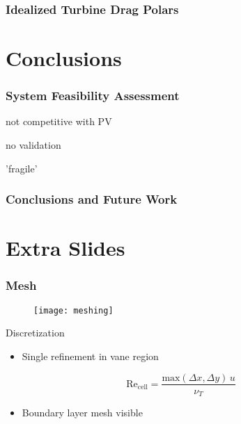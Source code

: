 \documentclass[mathserif]{beamer}
\begin{document}
%
%
\begin{frame}
 \frametitle{Idealized Turbine Drag Polars}



\end{frame}


%
%
\section{Conclusions}
\begin{frame}
 \frametitle{System Feasibility Assessment}

 not competitive with PV

 no validation

 'fragile'

\end{frame}

%
%
\begin{frame}
 \frametitle{Conclusions and Future Work}


\end{frame}


%
\appendix
\section{Extra Slides}


%
%
\begin{frame}
 \frametitle{Mesh}
 
 \begin{figure}[htb]
  \centering
  \texttt{[image: meshing]}
 \end{figure}
 
 \begin{block}{Discretization}
  \begin{itemize}
   \item Single refinement in vane region
  \end{itemize}
\begin{equation*}
	  \text{Re}_\text{cell} = \frac{\text{max}(\Delta x,\Delta y)
	   \, u}{\nu_T}
\end{equation*}	
  \begin{itemize}
   \item Boundary layer mesh visible
  \end{itemize}
 \end{block}
\end{frame}
\end{document}
